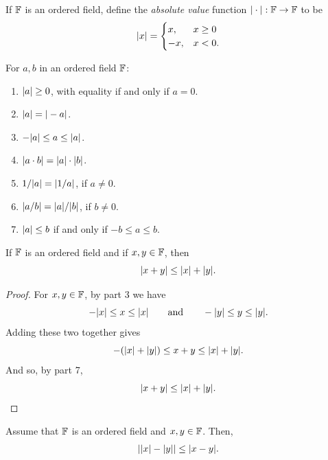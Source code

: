 \begin{definition}
  If $\mathbb F$ is an ordered field, define the \textit{absolute value}
  function $| \cdot | : \mathbb F \to \mathbb F$ to be
  \begin{align*}
    | x | =
    \begin{cases}
      x, & x \geq 0 \\
      -x, & x < 0.
    \end{cases}
  \end{align*}
\end{definition}

\begin{fact}
  For $a, b$ in an ordered field $\mathbb F$:
  \begin{enumerate}
    \item $| a | \geq 0$, with equality if and only if $a = 0$.
    \item $| a | = | -a |$.
    \item $-| a | \leq a \leq | a |$.
    \item $| a \cdot b | = | a | \cdot | b |$.
    \item $1/| a | = | 1/a |$, if $a \neq 0$.
    \item $| a/b | = | a |/| b |$, if $b \neq 0$.
    \item $| a | \leq b$ if and only if $-b \leq a \leq b$.
  \end{enumerate}
\end{fact}

\begin{theorem}
  If $\mathbb F$ is an ordered field and if $x, y \in \mathbb F$, then
  \[ | x + y | \leq | x | + | y |. \]
\end{theorem}

\begin{proof}
  For $x, y \in \mathbb F$, by  part 3 we have
  \[ -| x | \leq x \leq | x | \qquad \text{and} \qquad -| y |
  \leq y \leq | y |. \]
  Adding these two together gives
  \[ -(| x | + | y |) \leq x + y \leq | x | + | y |. \]
  And so, by  part 7,
  \[ | x + y | \leq | x | + | y |. \]
\end{proof}

\begin{corollary}
  Assume that $\mathbb F$ is an ordered field and $x, y \in \mathbb F$. Then,
  \begin{align*}
    | | x | - | y | | \leq | x - y |.
  \end{align*}
\end{corollary}

